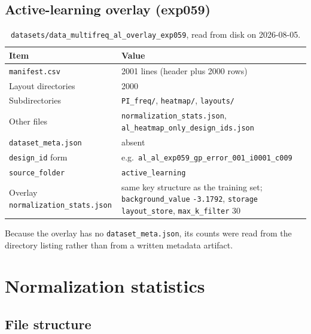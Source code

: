 \subsection{Active-learning overlay (exp059)}
\label{subsec:appA_overlay}

\begin{table}[htbp]
\centering
\caption{\texttt{datasets/\allowbreak{}data\_\allowbreak{}multifreq\_\allowbreak{}al\_\allowbreak{}overlay\_\allowbreak{}exp059}, read from disk on 2026-08-05.}
\label{tab:appA_overlay}
\begin{tabular}{p{} p{}}
\hline
Item & Value \\
\hline
\texttt{manifest.csv} & 2001 lines (header plus 2000 rows) \\
Layout directories & 2000 \\
Subdirectories & \texttt{PI\_freq/}, \texttt{heatmap/}, \texttt{layouts/} \\
Other files & \texttt{normalization\_stats.json},
\texttt{al\_\allowbreak{}heatmap\_\allowbreak{}only\_\allowbreak{}design\_\allowbreak{}ids.json} \\
\texttt{dataset\_meta.json} & absent \\
\texttt{design\_id} form &
e.g.\ \texttt{al\_\allowbreak{}al\_\allowbreak{}exp059\_\allowbreak{}gp\_\allowbreak{}error\_\allowbreak{}001\_\allowbreak{}i0001\_\allowbreak{}c009} \\
\texttt{source\_folder} & \texttt{active\_learning} \\
Overlay \texttt{normalization\_stats.json} &
same key structure as the training set; \texttt{background\_value} \texttt{-3.1792},
\texttt{storage} \texttt{layout\_store}, \texttt{max\_k\_filter} 30 \\
\hline
\end{tabular}
\end{table}

Because the overlay has no \texttt{dataset\_meta.json}, its counts were read from the directory
listing rather than from a written metadata artifact.

\section{Normalization statistics}
\label{sec:appA_normalization}

\subsection{File structure}
\label{subsec:appA_norm_structure}

